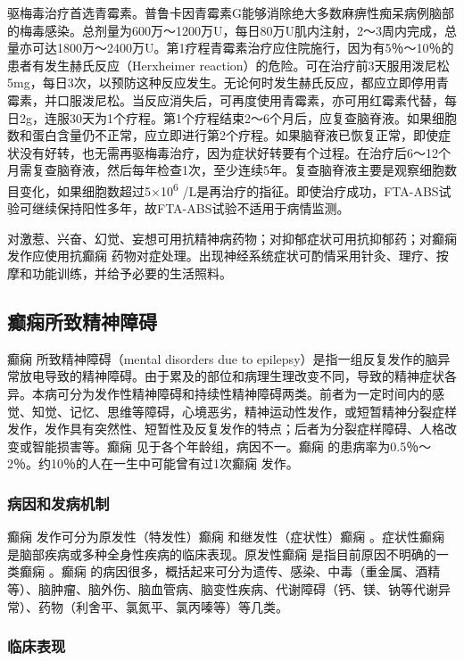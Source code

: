 驱梅毒治疗首选青霉素。普鲁卡因青霉素G能够消除绝大多数麻痹性痴呆病例脑部的梅毒感染。总剂量为600万～1200万U，每日80万U肌内注射，2～3周内完成，总量亦可达1800万～2400万U。第1疗程青霉素治疗应住院施行，因为有5％～10％的患者有发生赫氏反应（Herxheimer
reaction）的危险。可在治疗前3天服用泼尼松5mg，每日3次，以预防这种反应发生。无论何时发生赫氏反应，都应立即停用青霉素，并口服泼尼松。当反应消失后，可再度使用青霉素，亦可用红霉素代替，每日2g，连服30天为1个疗程。第1个疗程结束2～6个月后，应复查脑脊液。如果细胞数和蛋白含量仍不正常，应立即进行第2个疗程。如果脑脊液已恢复正常，即使症状没有好转，也无需再驱梅毒治疗，因为症状好转要有个过程。在治疗后6～12个月需复查脑脊液，然后每年检查1次，至少连续5年。复查脑脊液主要是观察细胞数目变化，如果细胞数超过5×10\textsuperscript{6}
/L是再治疗的指征。即使治疗成功，FTA-ABS试验可继续保持阳性多年，故FTA-ABS试验不适用于病情监测。

对激惹、兴奋、幻觉、妄想可用抗精神病药物；对抑郁症状可用抗抑郁药；对癫痫发作应使用抗癫痫
药物对症处理。出现神经系统症状可酌情采用针灸、理疗、按摩和功能训练，并给予必要的生活照料。

\subsection{癫痫所致精神障碍}

癫痫 所致精神障碍（mental disorders
due to
epilepsy）是指一组反复发作的脑异常放电导致的精神障碍。由于累及的部位和病理生理改变不同，导致的精神症状各异。本病可分为发作性精神障碍和持续性精神障碍两类。前者为一定时间内的感觉、知觉、记忆、思维等障碍，心境恶劣，精神运动性发作，或短暂精神分裂症样发作，发作具有突然性、短暂性及反复发作的特点；后者为分裂症样障碍、人格改变或智能损害等。癫痫
见于各个年龄组，病因不一。癫痫
的患病率为0.5％～2％。约10％的人在一生中可能曾有过1次癫痫
发作。

\subsubsection{病因和发病机制}

癫痫
发作可分为原发性（特发性）癫痫
和继发性（症状性）癫痫
。症状性癫痫
是脑部疾病或多种全身性疾病的临床表现。原发性癫痫
是指目前原因不明确的一类癫痫
。癫痫
的病因很多，概括起来可分为遗传、感染、中毒（重金属、酒精等）、脑肿瘤、脑外伤、脑血管病、脑变性疾病、代谢障碍（钙、镁、钠等代谢异常）、药物（利舍平、氯氮平、氯丙嗪等）等几类。

\subsubsection{临床表现}

